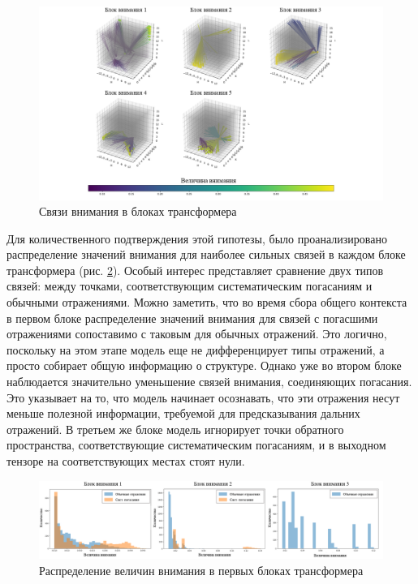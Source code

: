 \begin{figure}[H]
    \centering
    \includegraphics[width=1\textwidth]{figures/attention.png}
    \caption{Связи внимания в блоках трансформера}
    \label{attention_maps}
\end{figure}

Для количественного подтверждения этой гипотезы, было проанализировано распределение значений внимания для наиболее сильных связей в каждом блоке трансформера (рис. \ref{attention_maps}). Особый интерес представляет сравнение двух типов связей: между точками, соответствующим систематическим погасаниям и обычными отражениями. Можно заметить, что во время сбора общего контекста в первом блоке распределение значений внимания для связей с погасшими отражениями сопоставимо с таковым для обычных отражений. Это логично, поскольку на этом этапе модель еще не дифференцирует типы отражений, а просто собирает общую информацию о структуре. Однако уже во втором блоке наблюдается значительно уменьшение связей внимания, соединяющих погасания. Это указывает на то, что модель начинает осознавать, что эти отражения несут меньше полезной информации, требуемой для предсказывания дальних отражений. В третьем же блоке модель игнорирует точки обратного пространства, соответствующие систематическим погасаниям, и в выходном тензоре на соответствующих местах стоят нули. 

\begin{figure}[H]
    \centering
    \includegraphics[width=1\textwidth]{figures/attention_hist.png}
    \caption{Распределение величин внимания в первых блоках трансформера}
    \label{attention_maps}
\end{figure}

